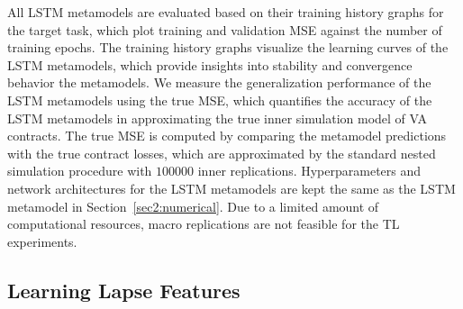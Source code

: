 All LSTM metamodels are evaluated based on their training history graphs for the target task, which plot training and validation MSE against the number of training epochs.
The training history graphs visualize the learning curves of the LSTM metamodels, which provide insights into stability and convergence behavior the metamodels.
We measure the generalization performance of the LSTM metamodels using the true MSE, which quantifies the accuracy of the LSTM metamodels in approximating the true inner simulation model of VA contracts.
The true MSE is computed by comparing the metamodel predictions with the true contract losses, which are approximated by the standard nested simulation procedure with $\num{100000}$ inner replications.
Hyperparameters and network architectures for the LSTM metamodels are kept the same as the LSTM metamodel in Section~\ref{sec2:numerical}. 
Due to a limited amount of computational resources, macro replications are not feasible for the TL experiments.


\subsection{Learning Lapse Features}

